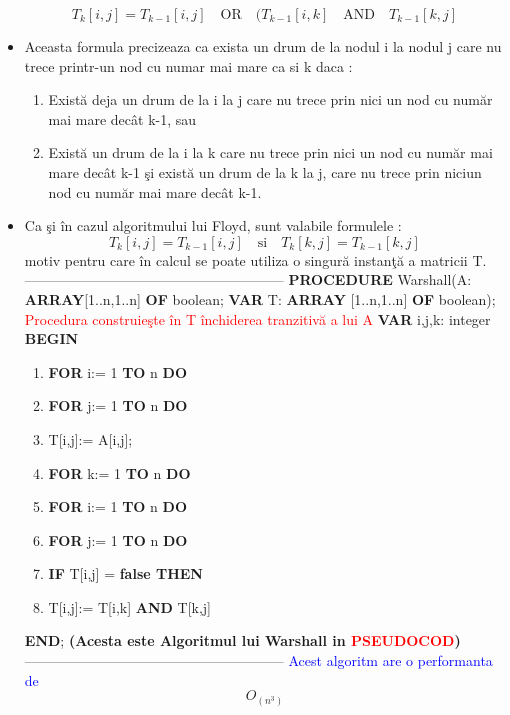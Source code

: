 \documentclass{report}
\begin{document}
\begin{flushleft}
\begin{itemize}
\[T_k  [i,j]  = T_{k-1} [i,j] \quad \textrm{OR} \quad (T_{k-1} [i,k]  \quad \textrm{AND} \quad  T_{k-1} [k,j] \]

\item Aceasta formula precizeaza ca exista un drum de la nodul i la nodul j care nu trece printr-un nod cu numar mai mare ca si k daca :
\begin{enumerate}
\item
Există deja un drum de la i la j care nu trece prin nici un nod cu număr
mai mare decât k-1, sau 
\item
Există un drum de la i la k care nu trece prin nici un nod cu număr mai
mare decât k-1 şi există un drum de la k la j, care nu trece prin niciun nod cu
număr mai mare decât k-1. 
\end{enumerate}
\item
Ca şi în cazul algoritmului lui Floyd, sunt valabile formulele :
\[T_k  [i,j]  = T_{k-1} [i,j] \quad \textrm {si} \quad T_k  [k,j]  = T_{k-1} [k,j] \]  
motiv pentru care în calcul se poate utiliza o singură instanţă a matricii T. 
\LARGE {--------------------------------------------------------}
\normalsize
\textbf {PROCEDURE} Warshall(A: \textbf {ARRAY}[1..n,1..n] \textbf{OF} boolean;
\newline
\textbf {VAR} T: \textbf {ARRAY} [1..n,1..n] \textbf{OF} boolean); 
\newline
\textcolor{red}{Procedura construieşte în T închiderea tranzitivă a lui A}
\newline
 \textbf {VAR} i,j,k: integer 
\newline
\textbf{BEGIN}
\begin{enumerate}
\item
 \textbf  {FOR} i:= 1  \textbf {TO} n  \textbf {DO}
\item
 \textbf {FOR} j:= 1  \textbf {TO} n  \textbf {DO}
\item
T[i,j]:= A[i,j]; 
\item
 \textbf {FOR} k:= 1  \textbf {TO} n  \textbf {DO}
\item
 \textbf {FOR} i:= 1  \textbf {TO} n  \textbf {DO}
\item
 \textbf {FOR} j:= 1  \textbf {TO} n  \textbf {DO} 
\item
 \textbf {IF} T[i,j] =  \textbf {false THEN}
\item
T[i,j]:= T[i,k]  \textbf {AND} T[k,j] 
\end{enumerate}
 \textbf {END};   \textbf { (Acesta este Algoritmul lui Warshall in \textcolor{red} {PSEUDOCOD})} 
\LARGE {--------------------------------------------------------}
\normalsize
\textcolor{blue}{Acest algoritm are o performanta de} \[O_(n^3)\]
\end{itemize}
\end{flushleft}
\end{document}
